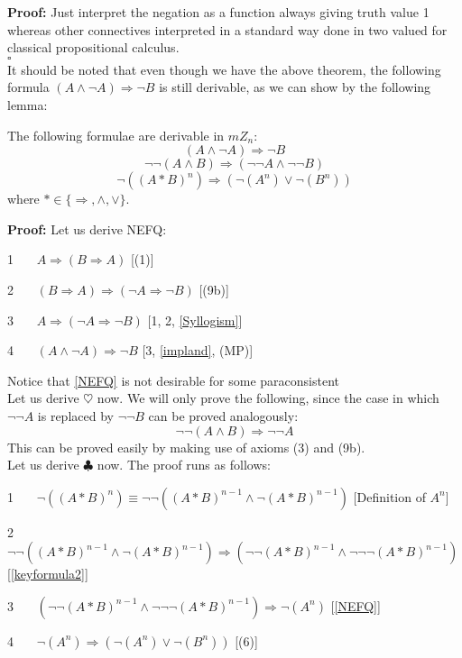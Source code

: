 \documentclass{llncs}
\begin{document}
\textbf{Proof:}  Just interpret the negation as a function always
giving truth value 1 whereas other connectives interpreted in a
standard way done in two valued for classical propositional
calculus.\\$\square$\\
It should be noted that even though we have the above theorem, the
following formula  $(A \land \neg A) \Rightarrow \neg B $ is still
derivable, as we can show by the following lemma:
\begin{lemma}
The following formulae are derivable in $mZ_n$:
\[ (A \land \neg A) \Rightarrow \neg B \tag*{NEFQ} \label{NEFQ} \]
\[ \neg \neg (A\land B) \Rightarrow (\neg \neg A\land \neg \neg B) \tag{$\heartsuit $} \label{keyformula2}
\]
\[ \neg ((A\ast B)^n)\Rightarrow (\neg (A^n) \lor \neg (B^n)) \tag{$\clubsuit $} \label{keyformula} \]
where $\ast\in \{ \Rightarrow , \land , \lor \}$.
\end{lemma}
\textbf{Proof:} Let us derive NEFQ:

1 \ \ \ $A\Rightarrow (B\Rightarrow A)$ \hfill[(1)]

2 \ \ \ $(B\Rightarrow A)\Rightarrow (\neg A \Rightarrow \neg B)$
\hfill[(9b)]

3 \ \ \ $A\Rightarrow (\neg A \Rightarrow \neg B)$ \hfill[1, 2,
\eqref{Syllogism}]

4 \ \ \ $(A \land \neg A) \Rightarrow \neg B$ \hfill[3,
\eqref{impland}, (MP)]

\noindent Notice that \eqref{NEFQ} is not desirable for some
paraconsistent\\
 Let us derive $\heartsuit $ now. We will only prove the following, since
the case in which $\neg \neg A$ is replaced by $\neg \neg B$ can be
proved analogously:
\[ \neg \neg (A\land B) \Rightarrow \neg \neg A \]
This can be proved easily by making use of axioms (3) and (9b).\\
Let us derive $\clubsuit $ now. The proof runs as follows:

1 \ \ \ $\neg ((A\ast B)^n)\equiv \neg \neg ((A\ast B)^{n-1}\land
\neg (A\ast B)^{n-1})$ \hfill[Definition of $A^n$]

2 \ \ \ $\neg \neg ((A\ast B)^{n-1}\land \neg (A\ast B)^{n-1})
\Rightarrow (\neg \neg (A\ast B)^{n-1}\land \neg \neg \neg (A\ast
B)^{n-1})$ \hfill[\eqref{keyformula2}]

3 \ \ \ $(\neg \neg (A\ast B)^{n-1}\land \neg \neg \neg (A\ast
B)^{n-1})\Rightarrow \neg (A^n)$ \hfill[\eqref{NEFQ}]

4 \ \ \ $\neg (A^n)\Rightarrow (\neg (A^n)\lor \neg (B^n))$
\hfill[(6)]
\end{document}
